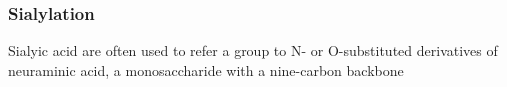 \subsubsection {Sialylation}
Sialyic acid are often used to refer a group to N- or O-substituted derivatives of neuraminic acid, a monosaccharide with a nine-carbon backbone